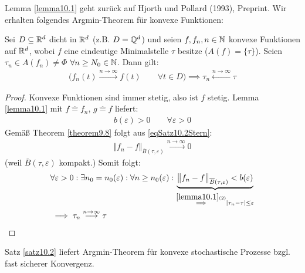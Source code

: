 
Lemma \ref{lemma10.1} geht zurück auf Hjorth und Pollard (1993), Preprint.
Wir erhalten folgendes Argmin-Theorem für konvexe Funktionen:

\begin{satz}\label{satz10.2}
	Sei $D\subseteq\mathbb{R}^d$ dicht in $\mathbb{R}^d$ (z.B. $D=\mathbb{Q}^d$) und seien $f,f_n,n\in\mathbb{N}$ konvexe Funktionen auf $\mathbb{R}^d$, wobei $f$ eine eindeutige Minimalstelle $\tau$ besitze ($A(f)=\lbrace\tau\rbrace$).
	Seien $\tau_n\in A(f_n)\neq\Phi$ $\forall n\geq N_0\in\mathbb{N}$.
	Dann gilt:
	\begin{align}\label{eqSatz10.2Stern}\tag{$\ast$}
		\Big(f_n(t)\overset{n\to\infty}{\longrightarrow} f(t)\qquad\forall t\in D\Big)\implies \tau_n\overset{n\to\infty}{\longleftarrow}\tau
	\end{align}
\end{satz}

\begin{proof}
	Konvexe Funktionen sind immer stetig, also ist $f$ stetig.
	Lemma \ref{lemma10.1} mit $f\hat{=}f_n$, $g\hat{=}f$ liefert:
	\begin{align*}
		b(\varepsilon)>0\qquad\forall\varepsilon>0
	\end{align*}
	Gemäß Theorem \ref{theorem9.8} folgt aus \eqref{eqSatz10.2Stern}:
	\begin{align*}
		\big\Vert f_n-f\big\Vert_{\overline{B}(\tau,\varepsilon)}\overset{n\to\infty}{\longrightarrow}0
	\end{align*}
	(weil $\overline{B}(\tau,\varepsilon)$ kompakt.)
	Somit folgt:
	\begin{align*}
		&\forall\varepsilon>0:\exists n_0=n_0(\varepsilon):\forall n\geq n_0(\varepsilon):
		\underbrace{\big\Vert f_n-f\big\Vert_{\overline{B}(\tau,\varepsilon)}<b(\varepsilon)}_{\overset{\ref{lemma10.1}(2)}{\implies}|\tau_n-\tau|\leq\varepsilon}\\
		&\implies \tau_n\overset{n\to\infty}{\longrightarrow}\tau
	\end{align*}
\end{proof}

Satz \ref{satz10.2} liefert Argmin-Theorem für konvexe stochastische Prozesse bzgl. fast sicherer Konvergenz.

